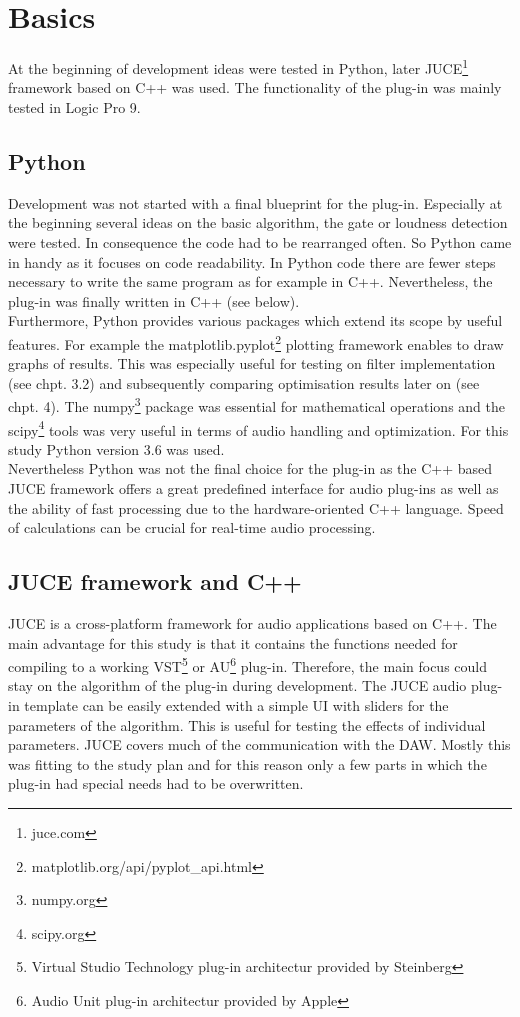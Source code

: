\chapter{Basics}
\label{chapter:basics}

At the beginning of development ideas were tested in Python, later JUCE\footnote{juce.com} framework based on C++ was used. The functionality of the plug-in was mainly tested in Logic Pro 9.\\

\section{Python}

Development was not started with a final blueprint for the plug-in. Especially at the beginning several ideas on the basic algorithm, the gate or loudness detection were tested. In consequence the code had to be rearranged often. So Python came in handy as it focuses on code readability. In Python code there are fewer steps necessary to write the same program as for example in C++. Nevertheless, the plug-in was finally written in C++ (see below).\\
Furthermore, Python provides various packages which extend its scope by useful features. For example the matplotlib.pyplot\footnote{matplotlib.org/api/pyplot\_api.html} plotting framework enables to draw graphs of results. This was especially useful for testing on filter implementation (see chpt. 3.2) and subsequently comparing optimisation results later on (see chpt. 4). The numpy\footnote{numpy.org} package was essential for mathematical operations and the scipy\footnote{scipy.org} tools was very useful in terms of audio handling and optimization. For this study Python version 3.6 was used.\\
Nevertheless Python was not the final choice for the plug-in as the C++ based JUCE framework offers a great predefined interface for audio plug-ins as well as the ability of fast processing due to the hardware-oriented C++ language. Speed of calculations can be crucial for real-time audio processing.\\

\section{JUCE framework and C++}

JUCE is a cross-platform framework for audio applications based on C++. The main advantage for this study is that it contains the functions needed for compiling to a working VST\footnote{Virtual Studio Technology plug-in architectur provided by Steinberg} or AU\footnote{Audio Unit plug-in architectur provided by Apple} plug-in. Therefore, the main focus could stay on the algorithm of the plug-in during development. The JUCE audio plug-in template can be easily extended with a simple UI with sliders for the parameters of the algorithm. This is useful for testing the effects of individual parameters. JUCE covers much of the communication with the DAW. Mostly this was fitting to the study plan and for this reason only a few parts in which the plug-in had special needs had to be overwritten.\\

